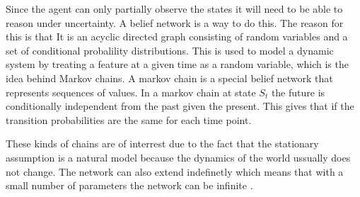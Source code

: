 Since the agent can only partially observe the states it will need to be able to
reason under uncertainty. A belief network is a way to do this. The reason for
this is that It is an acyclic directed graph consisting of random variables and
a set of conditional probalility distributions. This is used to model a dynamic
system by treating a feature at a given time as a random variable, which is the idea
behind Markov chains. A markov chain is a special belief network that
represents sequences of values. In a markov chain at state $S_t$ the future is
conditionally independent from the past given the present. This gives that if
the transition probabilities are the same for each time point. 

These kinds of chains are of interrest due to the fact that the stationary
assumption is a natural model because the dynamics of the world ussually does
not change. The network can also extend indefinetly which means that with a
small number of parameters the network can be infinite \citep[Ch.
6.5.1]{MIBook}.\nl

